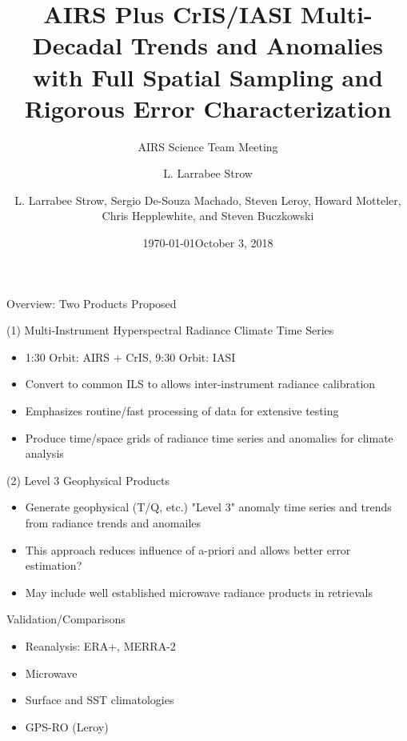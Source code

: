 \documentclass[10pt,t]{beamer}
\author{L. Larrabee Strow}
\date{\today}
\title{\large AIRS Plus CrIS/IASI Multi-Decadal Trends and Anomalies with Full Spatial Sampling and Rigorous Error Characterization}
\subtitle{\footnotesize{AIRS Science Team Meeting}}
\date{\vspace{0.1in}\footnotesize{October 3, 2018 \vfill}}
\author{L. Larrabee Strow\inst{1,2}, Sergio De-Souza Machado\inst{1,2}, Steven Leroy\inst{3}, Howard Motteler\inst{2}, Chris Hepplewhite\inst{2}, and Steven Buczkowski\inst{2}}
\institute[UMBC]{\inst{1} UMBC Physics Dept. \and \inst{2}UMBC JCET \and \inst{3} AER}
\begin{document}
\maketitle
{}

\begin{frame}[shrink=20,label={sec:orgc51264c}]{Overview:  Two Products Proposed}
\vspace{-0.1in}
\begin{block}{(1) Multi-Instrument Hyperspectral Radiance Climate Time Series}
\begin{itemize}
\item 1:30 Orbit: AIRS + CrIS, 9:30 Orbit: IASI
\item Convert to common ILS to allows inter-instrument radiance calibration
\item Emphasizes routine/fast processing of data for extensive testing
\item Produce time/space grids of radiance time series and anomalies for climate analysis
\end{itemize}
\end{block}

\begin{block}{(2) Level 3 Geophysical Products}
\begin{itemize}
\item Generate geophysical (T/Q, etc.) "Level 3" anomaly time series and trends from radiance trends and anomailes
\item This approach reduces influence of a-priori and allows better error estimation?
\item May include well established microwave radiance products in retrievals
\end{itemize}
\end{block}

\begin{block}{Validation/Comparisons}
\begin{itemize}
\item Reanalysis: ERA+, MERRA-2
\item Microwave
\item Surface and SST climatologies
\item GPS-RO (Leroy)
\end{itemize}
\end{block}
\end{frame}
\end{document}
